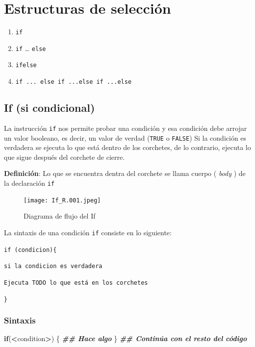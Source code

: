 \documentclass[
]{book}
\newenvironment{Shaded}{\begin{snugshade}}{\end{snugshade}}
\newcommand{\ControlFlowTok}[1]{\textcolor[rgb]{0.13,0.29,0.53}{\textbf{#1}}}
\newcommand{\DocumentationTok}[1]{\textcolor[rgb]{0.56,0.35,0.01}{\textbf{\textit{#1}}}}
\newcommand{\NormalTok}[1]{#1}
\newcommand{\SpecialCharTok}[1]{\textcolor[rgb]{0.81,0.36,0.00}{\textbf{#1}}}
\providecommand{\tightlist}{%
  \setlength{\itemsep}{0pt}\setlength{\parskip}{0pt}}
\begin{document}
\chapter{Estructuras de selección}\label{Estructuras_de_seleccion}

\begin{enumerate}
\def\labelenumi{\arabic{enumi}.}
\tightlist
\item
  \texttt{if}
\item
  \texttt{if} \ldots{} \texttt{else}
\item
  \texttt{ifelse}
\item
  \texttt{if\ ...\ else\ if\ ...else\ if\ ...else}
\end{enumerate}

\section{If (si condicional)}\label{if-si-condicional}

La instrucción \texttt{if} nos permite probar una condición y esa condición debe arrojar un valor booleano, es decir, un valor de verdad (\texttt{TRUE} o \texttt{FALSE}) Si la condición es verdadera se ejecuta lo que está dentro de los corchetes, de lo contrario, ejecuta lo que sigue después del corchete de cierre.

\textbf{Definición}: Lo que se encuentra dentra del corchete se llama cuerpo ( \emph{body} ) de la declaración \texttt{if}

\begin{figure}
\centering
\texttt{[image: If\_R.001.jpeg]}
\caption{Diagrama de flujo del If}\label{id}
\end{figure}

La sintaxis de una condición \texttt{if} consiste en lo siguiente:

\texttt{if\ (condicion)\{}

\texttt{si\ la\ condicion\ es\ verdadera}

\texttt{Ejecuta\ TODO\ lo\ que\ está\ en\ los\ corchetes}

\texttt{\}}

\subsection{Sintaxis}\label{sintaxis}

\begin{Shaded}
\begin{Highlighting}[]
\ControlFlowTok{if}\NormalTok{(}\SpecialCharTok{\textless{}}\NormalTok{condition}\SpecialCharTok{\textgreater{}}\NormalTok{) \{}
        \DocumentationTok{\#\# Hace algo}
\NormalTok{\} }
\DocumentationTok{\#\# Continúa con el resto del código}
\end{Highlighting}
\end{Shaded}
\end{document}
